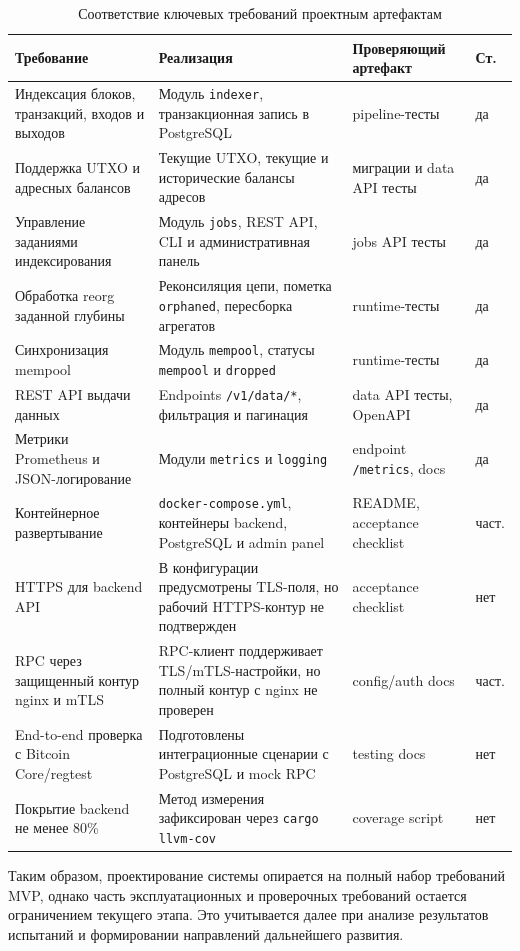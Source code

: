 \begin{table}
    \caption{Соответствие ключевых требований проектным артефактам}
    \label{tab:requirements-traceability}
    \begin{footnotesize}
\centering
\setlength{\tabcolsep}{3pt}
\renewcommand{\arraystretch}{0.95}
\begin{tabular}{|p{}|p{}|p{}|p{}|}\hline
    Требование & Реализация & Проверяющий артефакт & Ст. \\ \hline
    Индексация блоков, транзакций, входов и выходов &
    Модуль \texttt{indexer}, транзакционная запись в PostgreSQL &
    pipeline-тесты & да \\ \hline
    Поддержка UTXO и адресных балансов &
    Текущие UTXO, текущие и исторические балансы адресов &
    миграции и data API тесты & да \\ \hline
    Управление заданиями индексирования &
    Модуль \texttt{jobs}, REST API, CLI и административная панель &
    jobs API тесты & да \\ \hline
    Обработка reorg заданной глубины &
    Реконсиляция цепи, пометка \texttt{orphaned}, пересборка агрегатов &
    runtime-тесты & да \\ \hline
    Синхронизация mempool &
    Модуль \texttt{mempool}, статусы \texttt{mempool} и \texttt{dropped} &
    runtime-тесты & да \\ \hline
    REST API выдачи данных &
    Endpoints \texttt{/v1/data/*}, фильтрация и пагинация &
    data API тесты, OpenAPI & да \\ \hline
    Метрики Prometheus и JSON-логирование &
    Модули \texttt{metrics} и \texttt{logging} &
    endpoint \texttt{/metrics}, docs & да \\ \hline
    Контейнерное развертывание &
    \texttt{docker-compose.yml}, контейнеры backend, PostgreSQL и admin panel &
    README, acceptance checklist & част. \\ \hline
    HTTPS для backend API &
    В конфигурации предусмотрены TLS-поля, но рабочий HTTPS-контур не подтвержден &
    acceptance checklist & нет \\ \hline
    RPC через защищенный контур nginx и mTLS &
    RPC-клиент поддерживает TLS/mTLS-настройки, но полный контур с nginx не проверен &
    config/auth docs & част. \\ \hline
    End-to-end проверка с Bitcoin Core/regtest &
    Подготовлены интеграционные сценарии с PostgreSQL и mock RPC &
    testing docs & нет \\ \hline
    Покрытие backend не менее 80\% &
    Метод измерения зафиксирован через \texttt{cargo llvm-cov} &
    coverage script & нет \\ \hline
\end{tabular}
    \end{footnotesize}
\end{table}

Таким образом, проектирование системы опирается на полный набор требований
MVP, однако часть эксплуатационных и проверочных требований остается
ограничением текущего этапа. Это учитывается далее при анализе результатов
испытаний и формировании направлений дальнейшего развития.
